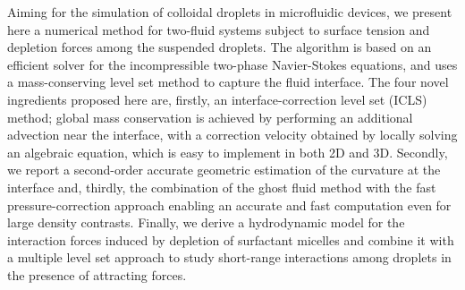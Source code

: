 \begin{paper}

\makepapertitle

%
\begin{paperabstract}
Aiming for the simulation of colloidal droplets in microfluidic devices, we present here a numerical method for two-fluid systems subject to surface tension and depletion forces among the suspended droplets. The algorithm is based on an efficient solver for the incompressible two-phase Navier-Stokes equations, and uses a mass-conserving level set method to capture the fluid interface. 
The four novel ingredients proposed here are, firstly, an interface-correction level set (ICLS) method; %
global mass conservation is achieved by performing an additional advection near the interface, with a correction velocity obtained by locally solving an algebraic equation, which is easy to implement in both 2D and 3D. 
Secondly, we report a second-order accurate geometric estimation of the curvature at the interface and, 
thirdly, the combination of the ghost fluid method with the fast pressure-correction approach enabling an accurate and fast computation even for large density contrasts. 
Finally, we derive %
a hydrodynamic model for the interaction forces
induced by depletion of surfactant micelles and combine it with a multiple level set approach to study short-range interactions among droplets in the presence of attracting forces.
\end{paperabstract}


%



%


%

\end{paper}
